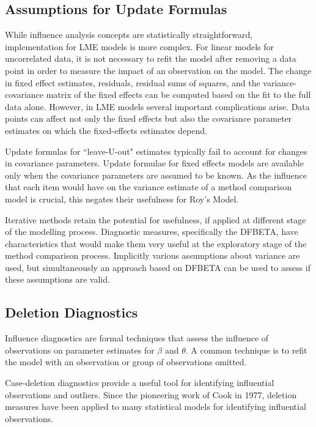 \documentclass[12pt, a4paper]{report}
\theoremstyle{plain}
\theoremstyle{definition}
\theoremstyle{remark}
\begin{document}
\subsection{Assumptions for Update Formulas}
While influence analysis concepts are statistically straightforward, implementation for LME models is more complex.
For linear models for uncorrelated data, it is not necessary to refit the model after removing a data point in order to measure the impact of an observation on the model. The change in fixed effect estimates, residuals, residual sums of squares, and the variance-covariance matrix of the fixed effects can be computed based on the fit to the full data alone. However, in LME models several important complications arise. Data points can affect not only the fixed effects but also the covariance parameter estimates on which the fixed-effects estimates depend.


Update formulas for ``leave-U-out" estimates typically fail to account for changes in covariance parameters. Update formulae for fixed effects models are available only when the covariance parameters are assumed to be known. As the influence that each item would have on the variance estimate of a method comparison model is crucial, this negates their usefulness for Roy's Model.


Iterative methods retain the potential for usefulness, if applied at different stage of the modelling process. Diagnostic measures, specifically the DFBETA, have characteristics that would make them very useful at the exploratory stage of the method comparison process. Implicitly various assumptions about variance are used, but simultaneously an approach based on DFBETA can be used to assess if these assumptions are valid.












\subsection{Deletion Diagnostics}
Influence diagnostics are formal techniques that assess the influence of observations on parameter estimates for $\beta$ and $\theta$. A common technique is to refit the model with an observation or group of observations omitted.

Case-deletion diagnostics provide a useful tool for identifying influential observations and outliers. Since the pioneering work of Cook in 1977, deletion measures have been applied to many statistical models for identifying influential observations.
\end{document}
